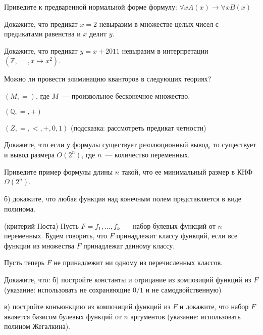 \setcounter{curtask}{38}


\begin{task}
    Приведите к предваренной нормальной форме формулу:
    $\forall x A(x) \rightarrow \forall x B(x)$
\end{task}

\begin{task}
    Докажите, что предикат $x = 2$ невыразим в множестве целых чисел с
    предикатами равенства и $x$ делит $y$.
\end{task}

\begin{task}
    Докажите, что предикат $y = x + 2011$ невыразим в интерпретации
    $(\mathbb{Z}, =, x \mapsto x^2)$.
\end{task}

Можно ли провести элиминацию кванторов в следующих теориях?

\begin{task}
    $(M, =)$, где $M$~--- произвольное бесконечное множество.
\end{task}

\begin{task}
    $(\mathbb{Q}, =, +)$
\end{task}

\begin{task}
    $(Z, =, <, +, 0, 1)$ (подсказка: рассмотреть предикат четности)
\end{task}

\breakline

\begin{ptask}{33}
    Докажите, что если у формулы существует резолюционный вывод, то
    существует и вывод размера $O(2^n)$, где $n$~--- количество переменных.
\end{ptask}

\begin{ptask}{34}
    Приведите пример формулы длины $n$ такой, что ее минимальный
    размер в КНФ $\Omega(2^n)$.
\end{ptask}

\begin{ptask}{36}
    б) докажите, что любая функция над конечным полем представляется в
	виде полинома.
\end{ptask}

\begin{ptask}{37} (критерий Поста)
	Пусть $F = {f_1, \dots, f_k}$~--- набор булевых функций от $n$
    переменных. Будем говорить, что $F$ принадлежит классу функций,
    если все функции из множества $F$ принадлежат данному классу.
    
    Пусть теперь $F$ не принадлежит ни одному из перечисленных
    классов.

    Докажите, что:
    б) постройте константы и отрицание из композиций функций из $F$
    (указание: использовать не сохраняющие $0/1$ и не самодвойственную)

    в) постройте конъюнкцию из композиций функций из $F$ и докажите,
    что набор $F$ является базисом булевых функций от $n$ аргументов
    (указание: использовать полином Жегалкина).

\end{ptask}